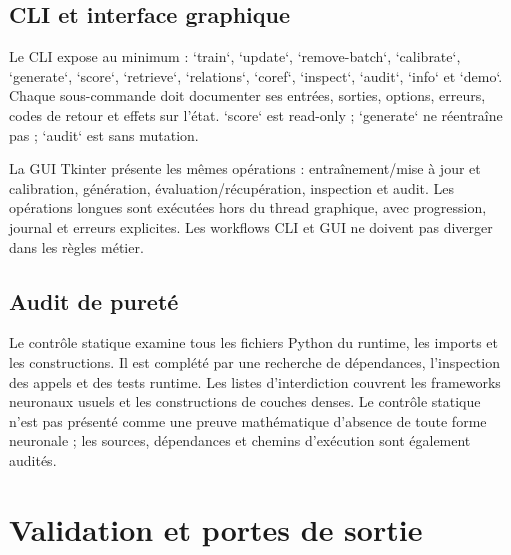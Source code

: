 \documentclass[11pt,a4paper,oneside,openany]{book}
\begin{document}
\chapter{CLI et interface graphique}
Le CLI expose au minimum : `train`, `update`, `remove-batch`, `calibrate`, `generate`, `score`, `retrieve`, `relations`, `coref`, `inspect`, `audit`, `info` et `demo`. Chaque sous-commande doit documenter ses entrées, sorties, options, erreurs, codes de retour et effets sur l'état. `score` est read-only ; `generate` ne réentraîne pas ; `audit` est sans mutation.

La GUI Tkinter présente les mêmes opérations : entraînement/mise à jour et calibration, génération, évaluation/récupération, inspection et audit. Les opérations longues sont exécutées hors du thread graphique, avec progression, journal et erreurs explicites. Les workflows CLI et GUI ne doivent pas diverger dans les règles métier.

\chapter{Audit de pureté}
Le contrôle statique examine tous les fichiers Python du runtime, les imports et les constructions. Il est complété par une recherche de dépendances, l'inspection des appels et des tests runtime. Les listes d'interdiction couvrent les frameworks neuronaux usuels et les constructions de couches denses. Le contrôle statique n'est pas présenté comme une preuve mathématique d'absence de toute forme neuronale ; les sources, dépendances et chemins d'exécution sont également audités.

\part{Validation et portes de sortie}
\end{document}
